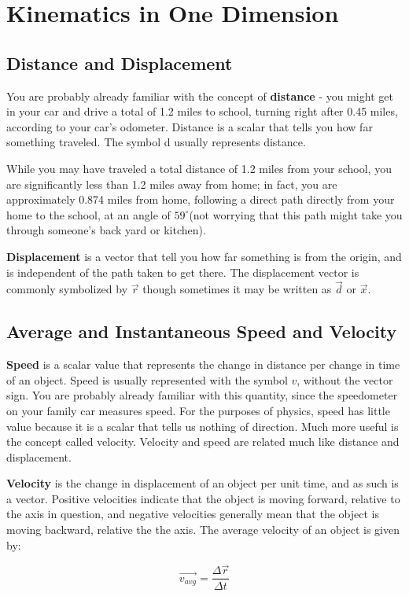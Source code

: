 \chapter{Kinematics in One Dimension}
\section{Distance and Displacement} 

You are probably already familiar with the concept of \textbf{distance} - you might get in your car and drive a total of 1.2 miles to school, turning right after 0.45 miles, according to your car's odometer.  Distance is a scalar that tells you how far something traveled.  The symbol d usually represents distance.

While you may have traveled a total distance of 1.2 miles from your school, you are significantly less than 1.2 miles away from home; in fact, you are approximately 0.874 miles from home, following a direct path directly from your home to the school, at an angle of $59^\circ $(not worrying that this path might take you through someone's back yard or kitchen).


  \textbf{Displacement}  is a vector that tell you how far something is from the origin, and is independent of the path taken to get there.  The displacement vector is commonly symbolized by $\vec{r}$ though sometimes it may be written as $\vec{d}$ or $\vec{x}$. 

\section{Average and Instantaneous Speed and Velocity}

\textbf{Speed} is a scalar value that represents the change in distance per change in time of an object.  Speed is usually represented with the symbol $v$, without the vector sign.  You are probably already familiar with this quantity, since the speedometer on your family car measures speed.  For the purposes of physics, speed has little value because it is a scalar that tells us nothing of direction.  Much more useful is the concept called velocity.  Velocity and speed are related much like distance and displacement.  

\textbf{Velocity} is the change in displacement of an object per unit time, and as such is a vector.  Positive velocities indicate that the object is moving forward, relative to the axis in question, and negative velocities generally mean that the object is moving backward, relative the the axis.  The average velocity of an object is given by:
\begin{mdframed}[backgroundcolor=orange!20!white]
	\begin{equation}
	\overrightarrow{v_{avg}} = \frac{\Delta\vec{r}}{\Delta t} 
		\label{eqn:velocity}
	\end{equation}
\end{mdframed}

